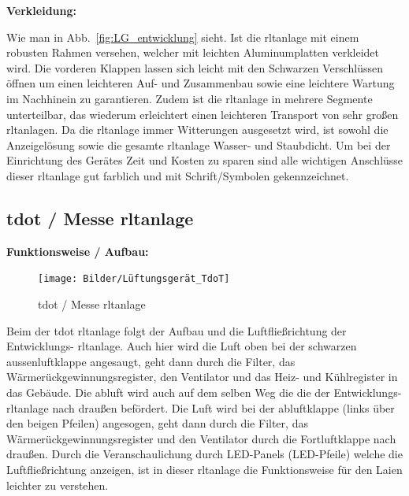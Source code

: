 \textbf{Verkleidung:}

Wie man in Abb.~\ref{fig:LG_entwicklung} sieht. Ist die \ac{rltanlage} mit einem robusten Rahmen versehen, welcher mit leichten Aluminumplatten verkleidet wird. Die vorderen Klappen lassen sich leicht mit den Schwarzen Verschlüssen öffnen um einen leichteren Auf- und Zusammenbau sowie eine leichtere Wartung im Nachhinein zu garantieren. Zudem ist die \ac{rltanlage} in mehrere Segmente unterteilbar, das wiederum erleichtert einen leichteren Transport von sehr großen \ac{rltanlagen}. Da die \ac{rltanlage} immer Witterungen ausgesetzt wird, ist sowohl die Anzeigelösung sowie die gesamte \ac{rltanlage} Wasser- und Staubdicht. Um bei der Einrichtung des Gerätes Zeit und Kosten zu sparen sind alle wichtigen Anschlüsse dieser \ac{rltanlage} gut farblich und mit Schrift/Symbolen gekennzeichnet. 





\subsection{\gls{tdot} / Messe \ac{rltanlage}}

\textbf{Funktionsweise / Aufbau:}
\begin{figure}[H]
	\centering
	\texttt{[image: Bilder/Lüftungsgerät\_TdoT]}
	\caption{\gls{tdot} / Messe \ac{rltanlage}} 
	\label{fig:LG_tdot}
\end{figure}

Beim der \gls{tdot} \ac{rltanlage} folgt der Aufbau und die Luftfließrichtung der Entwicklungs- \ac{rltanlage}. Auch hier wird die Luft oben bei der schwarzen \gls{aussenluft}klappe angesaugt, geht dann durch die Filter, das Wärmerückgewinnungsregister, den Ventilator und das Heiz- und Kühlregister in das Gebäude. Die \gls{abluft} wird auch auf dem selben Weg die die der Entwicklungs- \ac{rltanlage} nach draußen befördert. Die Luft wird bei der \gls{abluft}klappe (links über den beigen Pfeilen) angesogen, geht dann durch die Filter, das Wärmerückgewinnungsregister und den Ventilator durch die Fortluftklappe nach draußen. Durch die Veranschaulichung durch LED-Panels (LED-Pfeile) welche die Luftfließrichtung anzeigen, ist in dieser \ac{rltanlage} die Funktionsweise für den Laien leichter zu verstehen.

